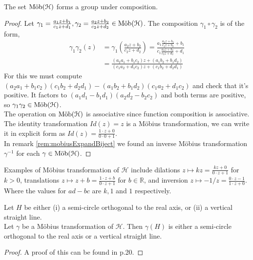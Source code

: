 \begin{proposition}
The set $\text{M{\"o}b}(\mathcal{H})$ forms a group under composition.
\end{proposition}
\begin{proof}
Let $\gamma_1 = \frac{a_1 z + b_1}{c_1 z + d_1}, \gamma_2 = \frac{a_2 z + b_2}{c_2 z + d_2} \in \text{M{\"o}b}(\mathcal{H})$.
The composition $\gamma_1 \circ \gamma_2$ is of the form,
\begin{equation}\label{eqn:mobiusComposition}
\begin{split}
\gamma_1 \gamma_2(z) & = \gamma_1(\frac{a_2z + b_2}{c_2z + d_2}) = \frac{a_1\frac{a_2z + b_2}{c_2z + b_2} + b_1 }{c_1 \frac{a_2z + b_2}{c_2z + d_2} + d_1} \\
& = \frac{(a_2a_1 + b_1c_2)z + (a_1b_2 + b_1d_2) }{(c_1a_2 + d_1c_2)z + (c_1b_2 + d_2d_1) }
\end{split}
\end{equation}
For this we must compute $(a_2a_1 + b_1c_2)(c_1b_2 + d_2d_1) - (a_1b_2 + b_1d_2)(c_1a_2 + d_1c_2)$ and check that it's positive. It factors to $(a_1d_1 - b_1d_1)(a_2d_2 - b_2c_2)$ and both terms are positive, so $\gamma_1 \gamma_2 \in \text{M{\"o}b}(\mathcal{H})$. \\

The operation on $\text{M{\"o}b}(\mathcal{H})$ is associative since function composition is associative. \\

The identity transformation $Id(z) = z$ is a Möbius transformation, we can write it in explicit form as $Id(z) = \frac{1\cdot z + 0}{0\cdot 0 + 1}$.\\

In remark \ref{rem:mobiusExpandBiject} we found an inverse Möbius transformation $\gamma^{-1}$ for each $\gamma \in \text{M{\"o}b}(\mathcal{H})$.
\end{proof}

\begin{example}
Examples of Möbius transformation of $\mathcal{H}$ include dilations $z \mapsto kz = \frac{kz + 0}{0\cdot z + 1}$ for $k > 0$, translations $z \mapsto z + b = \frac{1\cdot z + b}{0\cdot z + 1}$ for $b \in \mathbb{R}$, and inversion $z \mapsto -1/z = \frac{0\cdot z -1}{1\cdot z + 0}$. Where the values for $ad-bc$ are $k, 1$ and $1$ respectively.
\end{example}

\begin{proposition}\label{prop:mobiusCirclePreserve}
Let $H$ be either (i) a semi-circle orthogonal to the real axis, or (ii) a vertical straight line. \\
Let $\gamma$ be a Möbius transformation of $\mathcal{H}$. Then $\gamma(H)$ is either a semi-circle orthogonal to the real axis or a vertical straight line.
\end{proposition}
\begin{proof}
A proof of this can be found in \citep{manchesterNotes} p.20.
\end{proof}


